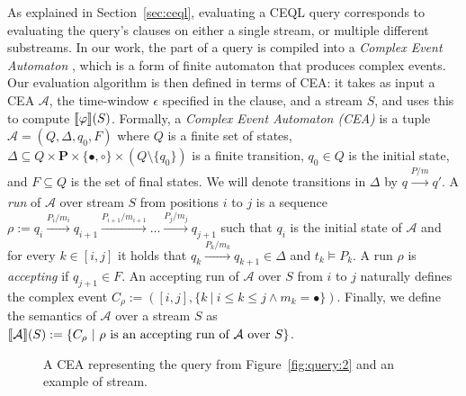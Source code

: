 As explained in Section~\ref{sec:ceql}, evaluating a CEQL query corresponds to evaluating the query's  clauses on either a single stream, or multiple different substreams. In our work, the  part of a query is compiled into a \emph{Complex Event Automaton} \cite{formal-framework-cep,formal-framework-cer}, which is a form of finite automaton that produces complex events. Our evaluation algorithm is then defined in terms of CEA: it takes as input a CEA $\mathcal{A}$, the time-window $\epsilon$ specified in the  clause, and a stream $S$, and uses this to compute $\llbracket \varphi \rrbracket(S)$. Formally, a \emph{Complex Event Automaton (CEA)} is a tuple $\mathcal{A} = (Q, \Delta, q_{0}, F)$ where $Q$ is a finite set of states, $\Delta \subseteq Q \times \textbf{P} \times \{\bullet, \circ\} \times (Q \setminus \{ q_{0} \})$ is a finite transition, $q_{0} \in Q$ is the initial state, and $F \subseteq Q$ is the set of final states. We will denote transitions in $\Delta$ by $q \xrightarrow[]{P/m} q'$. A \emph{run} of $\mathcal{A}$ over stream $S$ from positions $i$ to $j$ is a sequence $\rho := q_{i} \xrightarrow[]{P_{i}/m_{i}} q_{i+1} \xrightarrow[]{P_{i+1}/m_{i+1}} \ldots \xrightarrow[]{P_{j}/m_{j}} q_{j+1}$ such that $q_{i}$ is the initial state of $\mathcal{A}$ and for every $k \in [i,j]$ it holds that $q_{k} \xrightarrow[]{P_{k}/m_{k}} q_{k+1} \in \Delta$ and $t_{k} \vDash P_{k}$. A run $\rho$ is \emph{accepting} if $q_{j+1} \in F$. An accepting run of $\mathcal{A}$ over $S$ from $i$ to $j$ naturally defines the complex event $C_{\rho} := ([i, j], \{ k \ | \ i \le k \le j \land m_{k} = \bullet \})$. Finally, we define the semantics of $\mathcal{A}$ over a stream $S$ as $\llbracket \mathcal{A} \rrbracket(S) := \{ C_{\rho} \ | \ \rho \text{ is an accepting run of } \mathcal{A} \text{ over } S\}$.

\begin{figure}[t]
  \centering
  \begin{subfigure}[b]{\textwidth}
    \centering
    \vspace*{2em}
  \end{subfigure}
  \begin{subfigure}[t]{\textwidth}
    \centering
  \end{subfigure}

  \caption{A CEA representing the query from Figure~\ref{fig:query:2} and an example of stream.}
  \label{fig:cea}
\end{figure}


